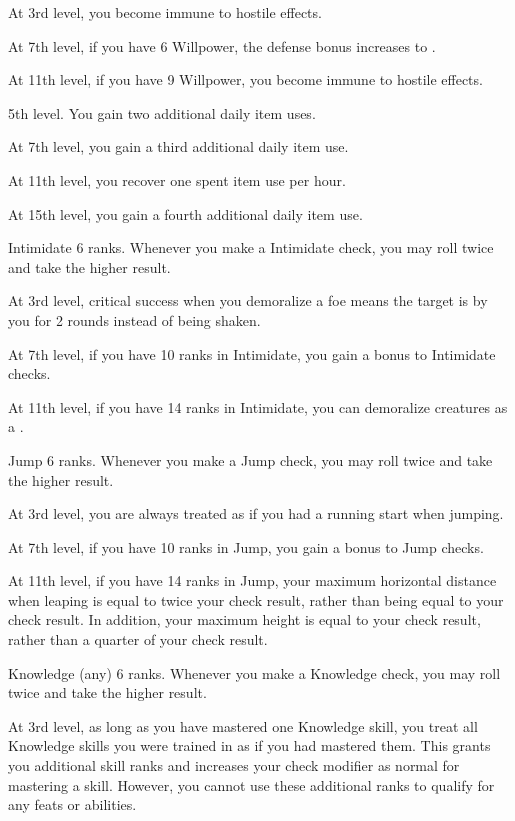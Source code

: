     At 3rd level, you become immune to hostile  effects.

    At 7th level, if you have 6 Willpower, the defense bonus increases to .

    At 11th level, if you have 9 Willpower, you become immune to hostile  effects.

    \featpre 5th level.
    \featben You gain two additional daily item uses.

    At 7th level, you gain a third additional daily item use.

    At 11th level, you recover one spent item use per hour.

    At 15th level, you gain a fourth additional daily item use.

    \featpre Intimidate 6 ranks.
    \featben Whenever you make a Intimidate check, you may roll twice and take the higher result.

    At 3rd level, critical success when you demoralize a foe means the target is \frightened by you for 2 rounds instead of being shaken.

    At 7th level, if you have 10 ranks in Intimidate, you gain a  bonus to Intimidate checks.

    At 11th level, if you have 14 ranks in Intimidate, you can demoralize creatures as a .

    \featpre Jump 6 ranks.
    \featben Whenever you make a Jump check, you may roll twice and take the higher result.

    At 3rd level, you are always treated as if you had a running start when jumping.

    At 7th level, if you have 10 ranks in Jump, you gain a  bonus to Jump checks.

    At 11th level, if you have 14 ranks in Jump, your maximum horizontal distance when leaping is equal to twice your check result, rather than being equal to your check result.
    In addition, your maximum height is equal to your check result, rather than a quarter of your check result.

    \featpre Knowledge (any) 6 ranks.
    \featben Whenever you make a Knowledge check, you may roll twice and take the higher result.

    At 3rd level, as long as you have mastered one Knowledge skill, you treat all Knowledge skills you were trained in as if you had mastered them.
    This grants you additional skill ranks and increases your check modifier as normal for mastering a skill.
    However, you cannot use these additional ranks to qualify for any feats or abilities.

